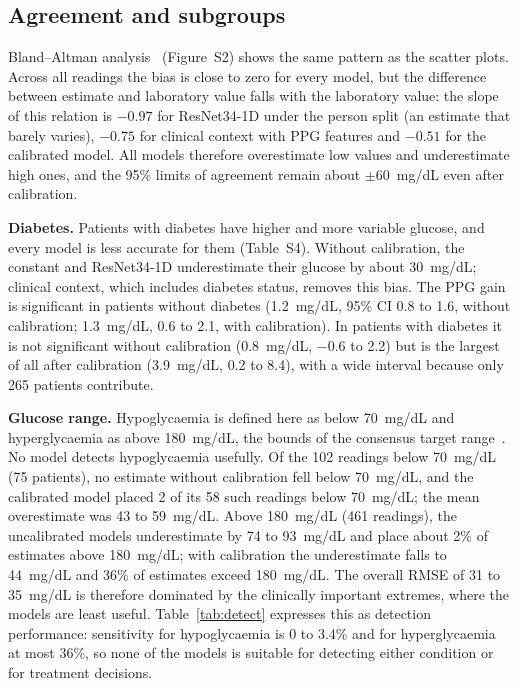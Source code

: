 \documentclass[11pt]{article}
\newcommand{\mgdl}{mg/dL}
\begin{document}
\subsection{Agreement and subgroups}
\label{sec:subgroups}
Bland--Altman analysis~\citep{bland1986} (Figure~S2) shows the same pattern as the scatter plots. Across all readings the bias is close to zero for every model, but the difference between estimate and laboratory value falls with the laboratory value: the slope of this relation is $-0.97$ for ResNet34-1D under the person split (an estimate that barely varies), $-0.75$ for clinical context with PPG features and $-0.51$ for the calibrated model. All models therefore overestimate low values and underestimate high ones, and the 95\% limits of agreement remain about $\pm60$~\mgdl{} even after calibration.



\textbf{Diabetes.} Patients with diabetes have higher and more variable glucose, and every model is less accurate for them (Table~S4). Without calibration, the constant and ResNet34-1D underestimate their glucose by about 30~\mgdl{}; clinical context, which includes diabetes status, removes this bias. The PPG gain is significant in patients without diabetes (1.2~\mgdl{}, 95\% CI 0.8 to 1.6, without calibration; 1.3~\mgdl{}, 0.6 to 2.1, with calibration). In patients with diabetes it is not significant without calibration (0.8~\mgdl{}, $-0.6$ to 2.2) but is the largest of all after calibration (3.9~\mgdl{}, 0.2 to 8.4), with a wide interval because only 265 patients contribute.

\textbf{Glucose range.} Hypoglycaemia is defined here as below 70~\mgdl{} and hyperglycaemia as above 180~\mgdl{}, the bounds of the consensus target range~\citep{ihsg2017,battelino2019}. No model detects hypoglycaemia usefully. Of the 102 readings below 70~\mgdl{} (75 patients), no estimate without calibration fell below 70~\mgdl{}, and the calibrated model placed 2 of its 58 such readings below 70~\mgdl{}; the mean overestimate was 43 to 59~\mgdl{}. Above 180~\mgdl{} (461 readings), the uncalibrated models underestimate by 74 to 93~\mgdl{} and place about 2\% of estimates above 180~\mgdl{}; with calibration the underestimate falls to 44~\mgdl{} and 36\% of estimates exceed 180~\mgdl{}. The overall RMSE of 31 to 35~\mgdl{} is therefore dominated by the clinically important extremes, where the models are least useful. Table~\ref{tab:detect} expresses this as detection performance: sensitivity for hypoglycaemia is 0 to 3.4\% and for hyperglycaemia at most 36\%, so none of the models is suitable for detecting either condition or for treatment decisions.
\end{document}
